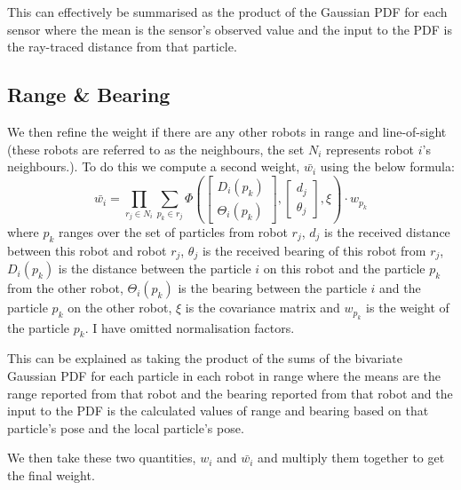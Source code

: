 \documentclass[a4paper, 10pt, conference]{ieeeconf}      %
\begin{document}
This can effectively be summarised as the product of the Gaussian PDF for each sensor where the mean is the sensor's observed value and the input to the PDF is the ray-traced distance from that particle.
\subsection{Range \& Bearing}
We then refine the weight if there are any other robots in range and line-of-sight (these robots are referred to as the neighbours, the set $N_i$ represents robot $i$'s neighbours.). To do this we compute a second weight, $\bar{w_i}$ using the below formula:
\[
	\bar{w_i} = \prod_{r_j \in N_i}\sum_{p_k \in r_j}\Phi\left(
	\begin{bmatrix}
		D_i(p_k)\\
		\Theta_i(p_k)
	\end{bmatrix},
	\begin{bmatrix}
		d_j\\
		\theta_j
	\end{bmatrix},
	\xi
	\right)\cdot w_{p_k}
\]
where $p_k$ ranges over the set of particles from robot $r_j$, $d_j$ is the received distance between this robot and robot $r_j$, $\theta_j$ is the received bearing of this robot from $r_j$, $D_i(p_k)$ is the distance between the particle $i$ on this robot and the particle $p_k$ from the other robot, $\Theta_i(p_k)$ is the bearing between the particle $i$ and the particle $p_k$ on the other robot, $\xi$ is the covariance matrix and $w_{p_k}$ is the weight of the particle $p_k$. I have omitted normalisation factors.

This can be explained as taking the product of the sums of the bivariate Gaussian PDF for each particle in each robot in range where the means are the range reported from that robot and the bearing reported from that robot and the input to the PDF is the calculated values of range and bearing based on that particle's pose and the local particle's pose.

We then take these two quantities, $w_i$ and $\bar{w_i}$ and multiply them together to get the final weight.
\end{document}

